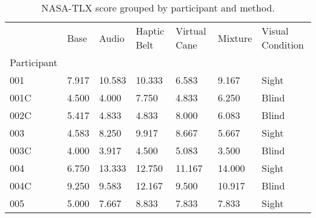 
\begin{table}[!htb]
\centering
\caption{NASA-TLX score grouped by participant and method.}
\label{tab:nasa_average}
\begin{tabular}{lllllll}
\toprule
{} &  Base &  Audio &  Haptic Belt &  Virtual Cane &  Mixture & Visual Condition \\
Participant &       &        &              &               &          &                  \\
\midrule
001         & 7.917 & 10.583 &       10.333 &         6.583 &    9.167 &            Sight \\
001C        & 4.500 &  4.000 &        7.750 &         4.833 &    6.250 &            Blind \\
002C        & 5.417 &  4.833 &        4.833 &         8.000 &    6.083 &            Blind \\
003         & 4.583 &  8.250 &        9.917 &         8.667 &    5.667 &            Sight \\
003C        & 4.000 &  3.917 &        4.500 &         5.083 &    3.500 &            Blind \\
004         & 6.750 & 13.333 &       12.750 &        11.167 &   14.000 &            Sight \\
004C        & 9.250 &  9.583 &       12.167 &         9.500 &   10.917 &            Blind \\
005         & 5.000 &  7.667 &        8.833 &         7.833 &    7.833 &            Sight \\
\bottomrule
\end{tabular}
\end{table}

